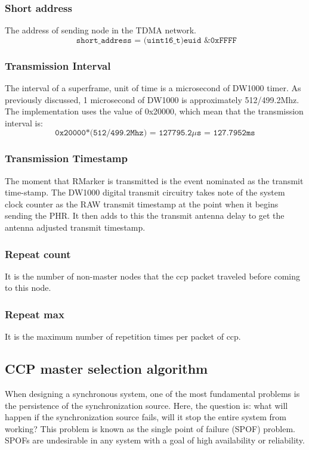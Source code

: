 \documentclass[\main/main.tex]{subfiles}
\begin{document}
\subsubsection{Short address}
The address of sending node in the TDMA network.
\begin{equation}
   \texttt{ short\_address = (uint16\_t)euid \& 0xFFFF}
\end{equation}

\subsubsection{Transmission Interval}
The interval of a superframe, unit of time is a microsecond of DW1000 timer. As previously discussed, 1 microsecond of DW1000 is approximately 512/499.2Mhz. The implementation uses the value of 0x20000, which mean that the transmission interval is:
\begin{equation}
    \texttt{0x20000*(512/499.2Mhz) = 127795.2$\mu$s = 127.7952ms}
\end{equation}

\subsubsection{Transmission Timestamp}
The moment that RMarker is transmitted is the event nominated as the transmit time-stamp. The DW1000 digital transmit circuitry takes note of the system clock counter as the RAW transmit timestamp at the point when it begins sending the PHR. It then adds to this the transmit antenna delay to get the antenna adjusted transmit timestamp.

\subsubsection{Repeat count}
It is the number of non-master nodes that the ccp packet traveled before coming to this node.

\subsubsection{Repeat max}
It is the maximum number of repetition times per packet of ccp.

\subsection{CCP master selection algorithm}

When designing a synchronous system, one of the most fundamental problems is the persistence of the synchronization source. Here, the question is: what will happen if the synchronization source fails, will it stop the entire system from working? This problem is known as the single point of failure (SPOF) problem. SPOFs are undesirable in any system with a goal of high availability or reliability.
\end{document}
